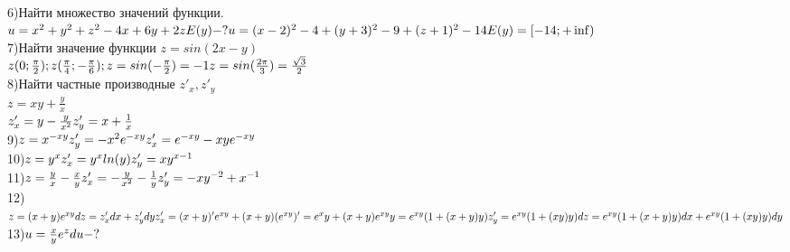 \documentclass[a4paper,11pt,twoside]{book}
\begin{document}
    \\
    6)Найти множество значений функции.\\
    $u=x^2+y^2+z^2-4x+6y+2z\\
    E(y)-?\\
    u=(x-2)^2-4+(y+3)^2-9+(z+1)^2-14\\
    E(y)=[-14;+\inf)$\\
    7)Найти значение функции $z=sin(2x-y)$\\
    $z(0;\frac{\pi}{2});z(\frac{\pi}{4};-\frac{\pi}{6});\\
    z=sin(-\frac{\pi}{2})=-1\\
    z=sin(\frac{2\pi}{3})=\frac{\sqrt{3}}{2}$\\
    8)Найти частные производные $z'_x,z'_y$\\
    $z=xy+\frac{y}{x}$\\
    $z'_x=y-\frac{y}{x^2}\\
    z'_y=x+\frac{1}{x}$\\
    9)$z=x^{-xy}\\
    z'_y=-x^2e^{-xy}\\
    z'_x=e^{-xy}-xye^{-xy}$\\
    10)$z=y^x\\
    z'_x=y^xln(y)\\
    z'_y=xy^{x-1}$\\
    11)$z=\frac{y}{x}-\frac{x}{y}\\
    z'_x=-\frac{y}{x^2}-\frac{1}{y}\\
    z'_y=-xy^{-2}+x^{-1}$\\
    12)$z=(x+y)e^{xy}\\
    dz=z'_xdx+z'_ydy\\
    z'_x=(x+y)'e^{xy}+(x+y)(e^{xy})'\\
    =e^xy+(x+y)e^{xy}y\\
    =e^{xy}(1+(x+y)y)\\
    z'_y=e^{xy}(1+(xy)y)\\
    dz=e^{xy}(1+(x+y)y)dx+e^{xy}(1+(xy)y)dy$\\
    13)$u=\frac{x}{y}e^z\\
    du-?$
\end{document}
